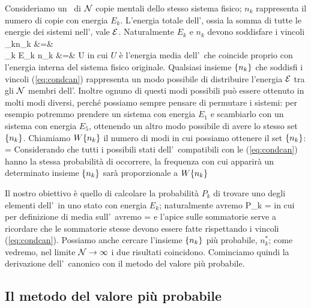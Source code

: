 Consideriamo un \ensemble\ di ${\mathcal N}$ copie mentali dello stesso sistema fisico; $n_k$ rappresenta il numero di copie con energia $E_k$. L'energia totale dell'\ensemble, ossia la somma di tutte le energie dei sistemi nell'\ensemble, vale ${\mathcal E}$. Naturalmente $E_k$ e $n_k$ devono soddisfare i vincoli
\bea
\label{eq:condcan}
\sum_{k}n_k      &=& \calN\nonumber\\
\sum_{k} E_k n_k &=& \calE \equiv U\calN
\eea
in cui $U$ è l'energia media dell'\ensemble\ che coincide proprio con l'energia interna del sistema fisico originale. 
Qualsiasi insieme $\{n_k\}$ che soddisfi i vincoli (\ref{eq:condcan}) rappresenta un modo possibile di distribuire l'energia ${\mathcal E}$ tra gli ${\mathcal N}$ membri dell'\ensemble. Inoltre ognuno di questi modi possibili può essere ottenuto in molti modi diversi, perché possiamo sempre pensare di permutare i sistemi: per esempio potremmo prendere un sistema con energia $E_1$ e scambiarlo con un sistema con energia $E_5$, ottenendo un altro modo possibile di avere lo stesso set $\{n_k\}$. Chiamiamo $W\{n_k\}$ il numero di modi in cui possiamo ottenere il set $\{n_k\}$:
\be
\label{eq:W}
\Wnk = 
\ee
Considerando che tutti i possibili stati dell'\ensemble\ compatibili con le (\ref{eq:condcan}) hanno la stessa probabilità di occorrere, la frequenza con cui apparirà un determinato insieme 
$\{n_k\}$ sarà proporzionale a $W\{n_k\}$

Il nostro obiettivo è quello di calcolare la probabilità $P_k$ di trovare uno degli elementi dell'\ensemble\ in uno stato con energia $E_k$; naturalmente avremo
\be
P_k = 
\ee
in cui per definizione di media sull'\ensemble\ avremo
\be
\label{eq:nrmean}
 = 
\ee
e l'apice sulle sommatorie serve a ricordare che le sommatorie stesse devono essere fatte rispettando i vincoli (\ref{eq:condcan}). Possiamo anche cercare l'insieme $\{n_k\}$ più probabile, $n_k^*$; come vedremo, nel limite ${\mathcal N}\to\infty$ i due risultati coincidono. Cominciamo quindi la derivazione dell'\ensemble\ canonico con il metodo del valore più probabile.

\subsection{Il metodo del valore più probabile}

